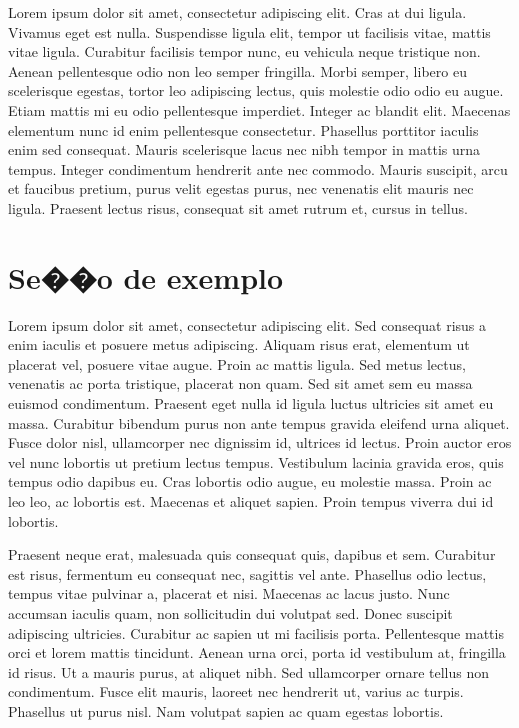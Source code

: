 \documentclass{ppgccufscar}
\begin{document}
Lorem ipsum dolor sit amet, consectetur adipiscing elit. Cras at dui ligula. Vivamus eget est nulla. Suspendisse ligula elit, tempor ut facilisis vitae, mattis vitae ligula. Curabitur facilisis tempor nunc, eu vehicula neque tristique non. Aenean pellentesque odio non leo semper fringilla. Morbi semper, libero eu scelerisque egestas, tortor leo adipiscing lectus, quis molestie odio odio eu augue. Etiam mattis mi eu odio pellentesque imperdiet. Integer ac blandit elit. Maecenas elementum nunc id enim pellentesque consectetur. Phasellus porttitor iaculis enim sed consequat. Mauris scelerisque lacus nec nibh tempor in mattis urna tempus. Integer condimentum hendrerit ante nec commodo. Mauris suscipit, arcu et faucibus pretium, purus velit egestas purus, nec venenatis elit mauris nec ligula. Praesent lectus risus, consequat sit amet rutrum et, cursus in tellus.

\section{Se��o de exemplo}

Lorem ipsum dolor sit amet, consectetur adipiscing elit. Sed consequat risus a enim iaculis et posuere metus adipiscing. Aliquam risus erat, elementum ut placerat vel, posuere vitae augue. Proin ac mattis ligula. Sed metus lectus, venenatis ac porta tristique, placerat non quam. Sed sit amet sem eu massa euismod condimentum. Praesent eget nulla id ligula luctus ultricies sit amet eu massa. Curabitur bibendum purus non ante tempus gravida eleifend urna aliquet. Fusce dolor nisl, ullamcorper nec dignissim id, ultrices id lectus. Proin auctor eros vel nunc lobortis ut pretium lectus tempus. Vestibulum lacinia gravida eros, quis tempus odio dapibus eu. Cras lobortis odio augue, eu molestie massa. Proin ac leo leo, ac lobortis est. Maecenas et aliquet sapien. Proin tempus viverra dui id lobortis.

Praesent neque erat, malesuada quis consequat quis, dapibus et sem. Curabitur est risus, fermentum eu consequat nec, sagittis vel ante. Phasellus odio lectus, tempus vitae pulvinar a, placerat et nisi. Maecenas ac lacus justo. Nunc accumsan iaculis quam, non sollicitudin dui volutpat sed. Donec suscipit adipiscing ultricies. Curabitur ac sapien ut mi facilisis porta. Pellentesque mattis orci et lorem mattis tincidunt. Aenean urna orci, porta id vestibulum at, fringilla id risus. Ut a mauris purus, at aliquet nibh. Sed ullamcorper ornare tellus non condimentum. Fusce elit mauris, laoreet nec hendrerit ut, varius ac turpis. Phasellus ut purus nisl. Nam volutpat sapien ac quam egestas lobortis.
\end{document}
